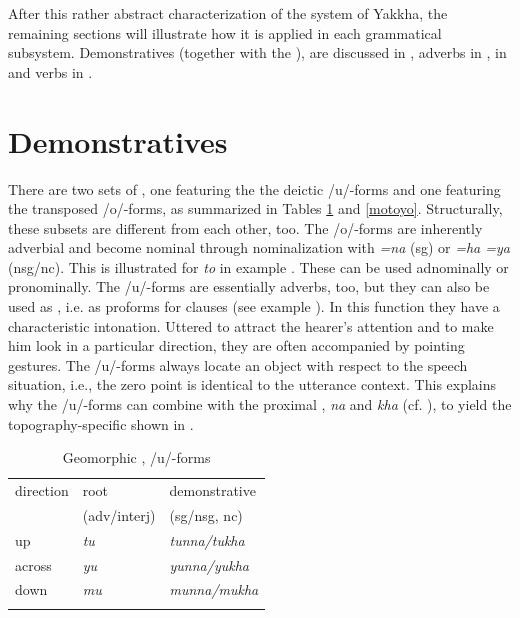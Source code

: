 After this rather abstract characterization of the  system of Yakkha, the remaining sections will illustrate how it is applied in each grammatical subsystem. Demonstratives (together with the ), are discussed in , adverbs in  ,   in  and verbs in .



\section{Demonstratives}\label{dem-pron-2}	

There are two sets of , one featuring the the deictic /u/-forms and one featuring the transposed /o/-forms, as summarized in Tables \ref{mutuyu} and \ref{motoyo}. Structurally, these subsets are different from each other, too.  The /o/-forms are inherently adverbial and become nominal through nominalization with \emph{=na} ({\sc sg}) or \emph{=ha \ti =ya} ({\sc nsg/nc}). This is illustrated for \emph{to} in example \Next. These  can be used adnominally or pronominally. 
The /u/-forms are  essentially adverbs, too, but they can also be used as , i.e. as proforms for clauses (see example \NNext). In this function they have a characteristic intonation. Uttered to attract the hearer's attention and to make him look in a particular direction, they are often accompanied by pointing gestures. The /u/-forms always locate an object with respect to the speech situation, i.e., the zero point is identical to the utterance context. This explains why the /u/-forms can combine with the proximal , \emph{na} and \emph{kha} (cf. ),  to yield the topography-specific  shown in . 

\begin{table}[htp]
\begin{centering}
\begin{tabular}{lll}
\lsptoprule
 {\sc direction} & {\sc root} & {\sc demonstrative}  \\
  & {\sc   ({\sc adv/interj})} & ({\sc sg/nsg, nc})\\
\midrule
{\sc up}&\emph{tu} &\emph{tunna/tukha}\\
{\sc across } &\emph{yu} &\emph{yunna/yukha}\\
{\sc down}&\emph{mu} &\emph{munna/mukha}\\
\lspbottomrule
\end{tabular}\\
\caption{Geomorphic ,  /u/-forms} \label{mutuyu}
\end{centering}
\end{table}


